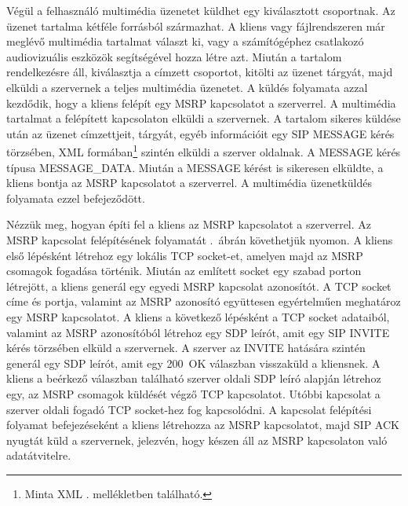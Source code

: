 Végül a felhasználó multimédia üzenetet küldhet egy kiválasztott csoportnak. Az üzenet tartalma kétféle forrásból származhat. A kliens vagy fájlrendszeren már meglévő multimédia tartalmat választ ki, vagy a számítógéphez csatlakozó audiovizuális eszközök segítségével hozza létre azt. Miután a tartalom rendelkezésre áll, kiválasztja a címzett csoportot, kitölti az üzenet tárgyát, majd elküldi a szervernek a teljes multimédia üzenetet. A küldés folyamata azzal kezdődik, hogy a kliens felépít egy MSRP kapcsolatot a szerverrel. A multimédia tartalmat a felépített kapcsolaton elküldi a szervernek. A tartalom sikeres küldése után az üzenet címzettjeit, tárgyát, egyéb információit egy SIP MESSAGE kérés törzsében, XML formában\footnote{Minta XML . mellékletben található.} szintén elküldi a szerver oldalnak. A MESSAGE kérés típusa MESSAGE\_DATA. Miután a MESSAGE kérést is sikeresen elküldte, a kliens bontja az MSRP kapcsolatot a szerverrel. A multimédia üzenetküldés folyamata ezzel befejeződött.

\medskip
Nézzük meg, hogyan építi fel a kliens az MSRP kapcsolatot a szerverrel. Az MSRP kapcsolat felépítésének folyamatát .~ábrán követhetjük nyomon. A kliens első lépésként létrehoz egy lokális TCP socket-et, amelyen majd az MSRP csomagok fogadása történik. Miután az említett socket egy szabad porton létrejött, a kliens generál egy egyedi MSRP kapcsolat azonosítót. A TCP socket címe és portja, valamint az MSRP azonosító együttesen egyértelműen meghatároz egy MSRP kapcsolatot. A kliens a következő lépésként a TCP socket adataiból, valamint az MSRP azonosítóból létrehoz egy SDP leírót, amit egy SIP INVITE kérés törzsében elküld a szervernek. A szerver az INVITE hatására szintén generál egy SDP leírót, amit egy 200~OK válaszban visszaküld a kliensnek. A kliens a beérkező válaszban található szerver oldali SDP leíró alapján létrehoz egy, az MSRP csomagok küldését végző TCP kapcsolatot. Utóbbi kapcsolat a szerver oldali fogadó TCP socket-hez fog kapcsolódni. A kapcsolat felépítési folyamat befejezéseként a kliens létrehozza az MSRP kapcsolatot, majd SIP ACK nyugtát küld a szervernek, jelezvén, hogy készen áll az MSRP kapcsolaton való adatátvitelre.

